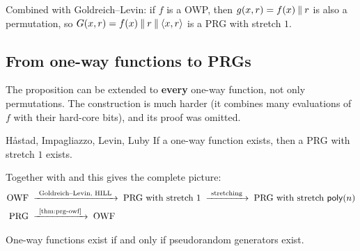 Combined with Goldreich--Levin: if $f$ is a OWP, then $g(x, r) = f(x) \mathbin{\Vert} r$ is also a permutation, so $G(x, r) = f(x) \mathbin{\Vert} r \mathbin{\Vert} \langle x, r \rangle$ is a PRG with stretch $1$.

\subsection{From one-way functions to PRGs}

The proposition can be extended to \textbf{every} one-way function, not only permutations. The construction is much harder (it combines many evaluations of $f$ with their hard-core bits), and its proof was omitted.

\begin{framedthm}[label={thm:hill}]{Håstad, Impagliazzo, Levin, Luby}
  If a one-way function exists, then a PRG with stretch $1$ exists.
\end{framedthm}

Together with  and  this gives the complete picture:
\[
  \begin{aligned}
    \text{OWF} \;&\xrightarrow{\ \text{Goldreich--Levin, HILL}\ }\; \text{PRG with stretch } 1 \;\xrightarrow{\ \text{stretching}\ }\; \text{PRG with stretch } \poly(n) \\
    \text{PRG} \;&\xrightarrow{\ \text{\Cref{thm:prg-owf}}\ }\; \text{OWF}
  \end{aligned}
\]
\begin{framedcor}{}
  One-way functions exist if and only if pseudorandom generators exist.
\end{framedcor}
